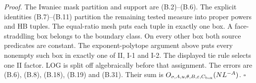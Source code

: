\emph{Proof.} The Iwaniec mask partition and support are (B.2)--(B.6).
The explicit identities (B.7)--(B.11) partition the remaining
tested measure into proper powers and HB tuples. The equal-ratio mesh
puts each tuple in exactly one box. A face-straddling box belongs to
the boundary class. On every other box both source predicates are constant. The
exponent-polytope argument above puts every nonempty such box in
exactly one of II, I-1 and I-2. The displayed tie rule selects
one II factor. LOG is split off algebraically before that assignment.
The errors are (B.6), (B.8), (B.18), (B.19) and (B.31). Their sum is
$O_{\sigma,A,u,\theta,B,\varepsilon,C_{\rm box}}(NL^{-A})$. \hfill$\square$

\endgroup
